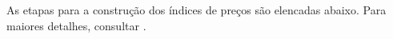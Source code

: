 \documentclass[twoside,a4paper,11pt]{report}
\begin{document}
% 
% 

As etapas para a construção dos índices de preços são elencadas abaixo. Para maiores detalhes, consultar \citet{ibgemetodos}.
\end{document}
